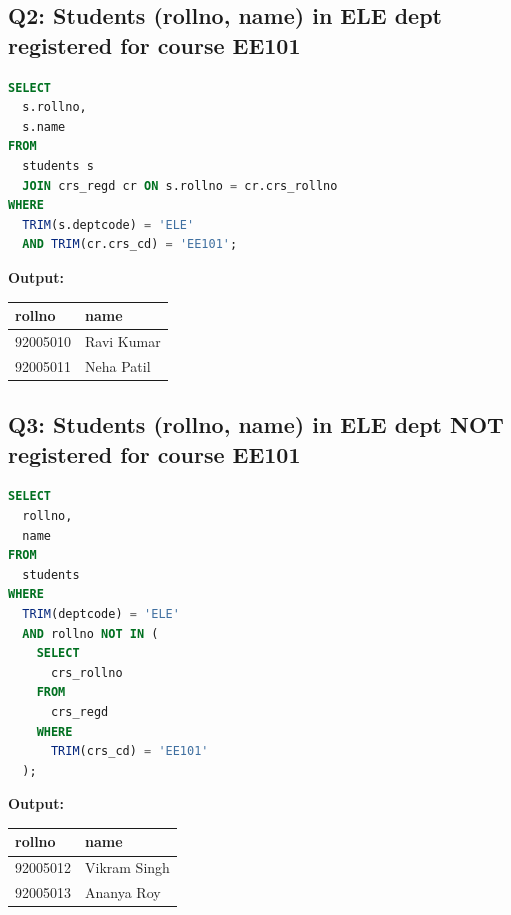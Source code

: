 \documentclass[11pt, a4paper]{article}
\begin{document}
\subsection*{Q2: Students (rollno, name) in ELE dept registered for course EE101}
\begin{lstlisting}[language=SQL]
SELECT
  s.rollno,
  s.name
FROM
  students s
  JOIN crs_regd cr ON s.rollno = cr.crs_rollno
WHERE
  TRIM(s.deptcode) = 'ELE'
  AND TRIM(cr.crs_cd) = 'EE101';
\end{lstlisting}
\vspace{0.3cm}
\textbf{Output:}\vspace{0.2cm}
\begin{center}
\begin{tabular}{|l|l|}
\hline
\textbf{rollno} & \textbf{name} \\ \hline
92005010 & Ravi Kumar                     \\ \hline
92005011 & Neha Patil                     \\ \hline
\end{tabular}
\end{center}
\newpage
\subsection*{Q3: Students (rollno, name) in ELE dept NOT registered for course EE101}
\begin{lstlisting}[language=SQL]
SELECT
  rollno,
  name
FROM
  students
WHERE
  TRIM(deptcode) = 'ELE'
  AND rollno NOT IN (
    SELECT
      crs_rollno
    FROM
      crs_regd
    WHERE
      TRIM(crs_cd) = 'EE101'
  );
\end{lstlisting}
\vspace{0.3cm}
\textbf{Output:}\vspace{0.2cm}
\begin{center}
\begin{tabular}{|l|l|}
\hline
\textbf{rollno} & \textbf{name} \\ \hline
92005012 & Vikram Singh                   \\ \hline
92005013 & Ananya Roy                     \\ \hline
\end{tabular}
\end{center}
\newpage
\end{document}
